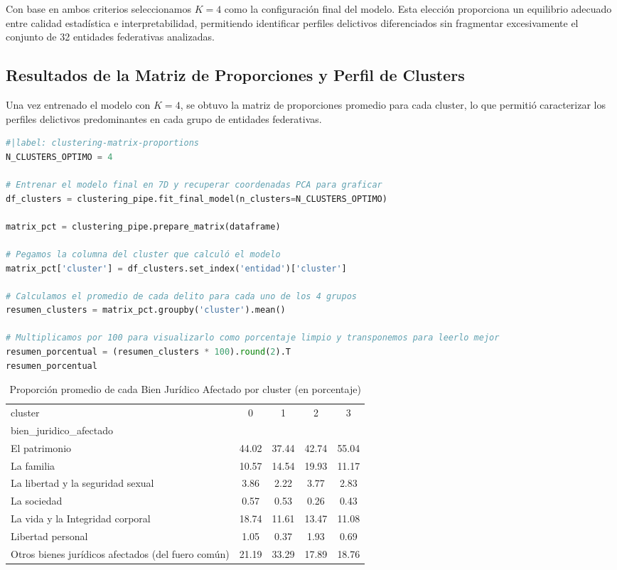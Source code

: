 Con base en ambos criterios seleccionamos $K=4$ como la configuración final del modelo. Esta elección proporciona
un equilibrio adecuado entre calidad estadística e interpretabilidad, permitiendo identificar perfiles delictivos
diferenciados sin fragmentar excesivamente el conjunto de 32 entidades federativas analizadas.

\subsection{Resultados de la Matriz de Proporciones y Perfil de Clusters}

Una vez entrenado el modelo con $K=4$, se obtuvo la matriz de proporciones promedio para cada cluster, lo que permitió
caracterizar los perfiles delictivos predominantes en cada grupo de entidades federativas.

\begin{lstlisting}[language=Python,caption={Entrenamiento final y resumen de proporciones por cluster.},label={lst:clustering-matrix-proportions}]
#|label: clustering-matrix-proportions
N_CLUSTERS_OPTIMO = 4

# Entrenar el modelo final en 7D y recuperar coordenadas PCA para graficar
df_clusters = clustering_pipe.fit_final_model(n_clusters=N_CLUSTERS_OPTIMO)

matrix_pct = clustering_pipe.prepare_matrix(dataframe)

# Pegamos la columna del cluster que calculó el modelo
matrix_pct['cluster'] = df_clusters.set_index('entidad')['cluster']

# Calculamos el promedio de cada delito para cada uno de los 4 grupos
resumen_clusters = matrix_pct.groupby('cluster').mean()

# Multiplicamos por 100 para visualizarlo como porcentaje limpio y transponemos para leerlo mejor
resumen_porcentual = (resumen_clusters * 100).round(2).T
resumen_porcentual
\end{lstlisting}

\begin{table}[ht]
\centering
\caption{Proporción promedio de cada Bien Jurídico Afectado por cluster (en porcentaje)}
\begin{tabular}{l c c c c}
\hline
cluster	& 0	& 1	& 2	& 3 \\
bien\_juridico\_afectado \\
El patrimonio & 44.02 & 37.44 & 42.74 & 55.04 \\
La familia & 10.57 & 14.54 & 19.93 & 11.17 \\
La libertad y la seguridad sexual & 3.86 & 2.22 & 3.77 & 2.83 \\
La sociedad & 0.57 & 0.53 & 0.26 & 0.43 \\
La vida y la Integridad corporal & 18.74 & 11.61 & 13.47 & 11.08 \\
Libertad personal & 1.05 & 0.37 & 1.93 & 0.69 \\
Otros bienes jurídicos afectados (del fuero común) & 21.19 & 33.29 & 17.89 & 18.76 \\
\hline
\end{tabular}
\label{tab:cluster-proportions}
\end{table}

